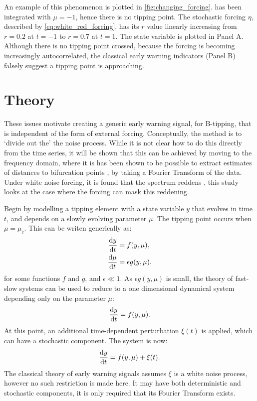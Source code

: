 An example of this phenomenon is plotted in
\cref{fig:changing_forcing}.  
 has been integrated with $\mu = -1$, hence there is no 
tipping point. The stochastic forcing $\eta$, described by \cref{eq:white_red_forcing}, has its $r$ value
linearly increasing
from $r=0.2$ at $t=-1$ to $r=0.7$ at $t=1$. The state
variable is plotted in Panel A. Although there is no
tipping point crossed, because the forcing is becoming 
increasingly autocorrelated, the classical early warning indicators 
(Panel B) falsely suggest a tipping point is approaching.

\section{Theory}
\label{sec:theory}
These issues motivate creating a generic early warning signal, 
for B-tipping, that is 
independent of the form of external forcing. Conceptually,
the method is to `divide out the' the noise process.
While it is not clear
how to do this directly from the time series, it will be shown that this can be achieved by moving
to the frequency domain, where it is has been shown to be possible
to extract estimates of distances to bifurcation 
points \parencite{Kleinen2003}, by taking a Fourier Transform of the data. 
Under white noise forcing, it is found that the spectrum reddens \parencite{Kefi2014,Dakos2012c}, this study looks at the case where the forcing 
can mask this reddening.

Begin by modelling a tipping element with a state variable $y$ that evolves in time $t$, and depends on a slowly evolving parameter $\mu$.  The tipping point occurs when $\mu=\mu_c$.
This can be writen generically as:
\begin{eqnarray}
\label{eq:full_syste}
    \dv{y}{t} &= f(y,\mu),\\
    \dv{\mu}{t} &= \epsilon g(y,\mu).
\end{eqnarray}
for some functions $f$ and $g$, and $\epsilon \ll 1$.
As $\epsilon g(y,\mu)$ is small, the theory of fast-slow systems \parencite{Kuehn2011} can be used to reduce to a one
dimensional dynamical system depending only on the parameter $\mu$:
\begin{equation}
  \label{eq:1d_dynamical_sys}
  \dv{y}{t} = f(y,\mu).
\end{equation}
At this point, an additional time-dependent perturbation $\xi(t)$ is applied, which can have a stochastic component. The system is now:
\begin{equation}
  \label{eq:1d_dyn_sys_forced}
  \dv{y}{t} = f(y,\mu) + \xi(t).
\end{equation}
The classical theory of early warning signals assumes $\xi$ is a white noise process, however no such restriction is made here. It may have both
deterministic and stochastic components, it is only required that its Fourier Transform exists.

